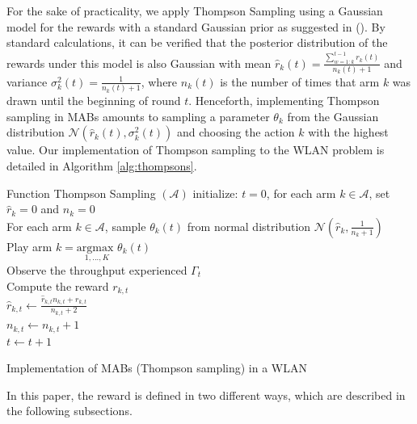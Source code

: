 \documentclass{article}
\begin{document}
For the sake of practicality, we apply Thompson Sampling using a Gaussian model for the rewards with a standard Gaussian prior as suggested in (\citealp{agrawal2013further}). By standard calculations, it can be verified that the posterior distribution of the rewards under this model is also Gaussian with mean $\hat{r}_k(t) = \frac{\sum_{w=1:k}^{t-1} r_k(t) }{n_k(t) + 1}$ and variance $\sigma_k^2(t) = \frac{1}{n_k(t) + 1}$, where $n_k(t)$ is the number of times that arm $k$ was drawn until the beginning of round $t$. Henceforth, implementing Thompson sampling in MABs amounts to sampling a parameter $\theta_k$ from the Gaussian distribution $\mathcal{N}\left(\hat{r}_k(t),\sigma_k^2(t)\right)$ and choosing the action $k$ with the highest value. Our implementation of Thompson sampling to the WLAN problem is detailed in Algorithm \ref{alg:thompsons}.	
\begin{algorithm}[h!]
	Function Thompson Sampling $(\mathcal{A})$\;
	initialize: $t=0$,  for each arm $k \in \mathcal{A}$, set $\hat{r}_{k} = 0$ and $n_k = 0$ \\
	{
		For each arm $k \in \mathcal{A}$, sample $\theta_k(t)$ from normal distribution $\mathcal{N}(\hat{r}_{k}, \frac{1}{n_k + 1})$ \\
		Play arm $k = \underset{1,...,K}{\text{argmax }} \theta_k(t) $ \\
		Observe the throughput experienced $\Gamma_t$\\			
		Compute the reward $r_{k,t}$ \\
		$ \hat{r}_{k,t} \leftarrow \frac{\hat{r}_{k,t}  n_{k,t} + r_{k,t}}{n_{k,t} + 2}$\\
		$n_{k,t} \leftarrow n_{k,t} + 1$\\
		$t \leftarrow t + 1$
	}
	\caption{Implementation of MABs (Thompson sampling) in a WLAN}
	\label{alg:thompsons}
\end{algorithm}	

In this paper, the reward is defined in two different ways, which are described in the following subsections.

\end{document}

